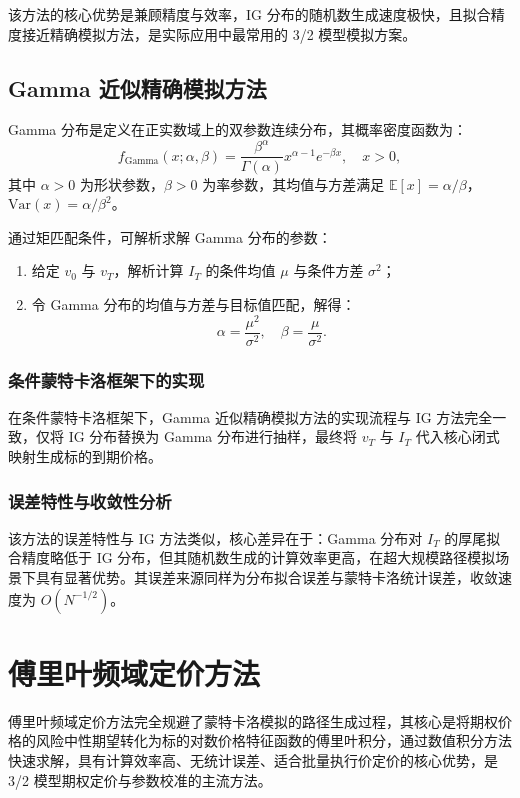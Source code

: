 该方法的核心优势是兼顾精度与效率，IG 分布的随机数生成速度极快，且拟合精度接近精确模拟方法，是实际应用中最常用的 3/2 模型模拟方案。

\subsection{Gamma 近似精确模拟方法}
Gamma 分布是定义在正实数域上的双参数连续分布，其概率密度函数为：
\begin{equation}
  f_{\text{Gamma}}(x; \alpha, \beta) = \frac{\beta^\alpha}{\Gamma(\alpha)} x^{\alpha-1} e^{-\beta x}, \quad x > 0,
\end{equation}
其中 $\alpha > 0$ 为形状参数，$\beta > 0$ 为率参数，其均值与方差满足 $\mathbb{E}[x] = \alpha/\beta$，$\mathrm{Var}(x) = \alpha/\beta^2$。

通过矩匹配条件，可解析求解 Gamma 分布的参数：
\begin{enumerate}
    \item 给定 $v_0$ 与 $v_T$，解析计算 $I_T$ 的条件均值 $\mu$ 与条件方差 $\sigma^2$；
    
    \item 令 Gamma 分布的均值与方差与目标值匹配，解得：
    \begin{equation}
    \alpha = \frac{\mu^2}{\sigma^2}, \quad \beta = \frac{\mu}{\sigma^2}.
    \end{equation}
\end{enumerate}
\subsubsection{条件蒙特卡洛框架下的实现}
在条件蒙特卡洛框架下，Gamma 近似精确模拟方法的实现流程与 IG 方法完全一致，仅将 IG 分布替换为 Gamma 分布进行抽样，最终将 $v_T$ 与 $I_T$ 代入核心闭式映射生成标的到期价格。

\subsubsection{误差特性与收敛性分析}
该方法的误差特性与 IG 方法类似，核心差异在于：Gamma 分布对 $I_T$ 的厚尾拟合精度略低于 IG 分布，但其随机数生成的计算效率更高，在超大规模路径模拟场景下具有显著优势。其误差来源同样为分布拟合误差与蒙特卡洛统计误差，收敛速度为 $O(N^{-1/2})$。

\section {傅里叶频域定价方法}
傅里叶频域定价方法完全规避了蒙特卡洛模拟的路径生成过程，其核心是将期权价格的风险中性期望转化为标的对数价格特征函数的傅里叶积分，通过数值积分方法快速求解，具有计算效率高、无统计误差、适合批量执行价定价的核心优势，是 3/2 模型期权定价与参数校准的主流方法。

